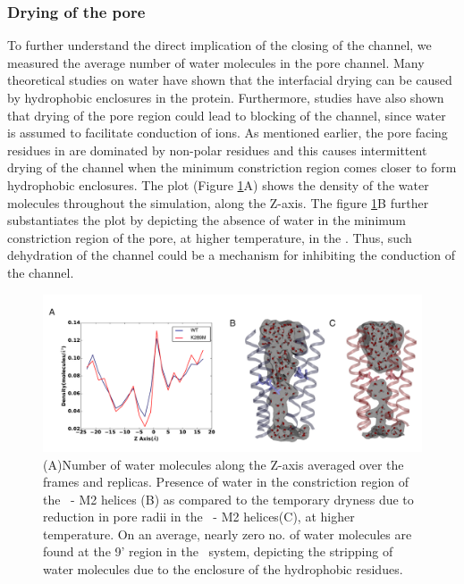 \documentclass[12pt,onecolumn]{biophys}
\begin{document}
\subsubsection*{Drying of the pore}
To further understand the direct implication of the closing of the \MT channel, we measured the average number of water molecules in the pore channel. Many theoretical studies on water have shown that the interfacial drying can be caused by hydrophobic enclosures in the protein\cite{Zhu2010}. Furthermore, studies\cite{Zhu2012,Dong2013} have also shown that drying of the pore region could lead to blocking of the channel, since water is assumed to facilitate conduction of ions. As mentioned earlier, the pore facing residues in \GABAA are dominated by non-polar residues and this causes intermittent drying of the channel when the minimum constriction region comes closer to form hydrophobic enclosures. The plot (Figure \ref{fig:pore_water}A) shows the density of the water molecules throughout the simulation, along the Z-axis. The figure \ref{fig:pore_water}B further substantiates the plot by depicting the absence of water in the minimum constriction region of the pore, at higher temperature, in the \MTs . Thus, such dehydration of the channel could be a mechanism for inhibiting the conduction of the channel.

\begin{figure}
\begin{center}
\includegraphics[width = 1\textwidth]{figures/water_pore.pdf}
\end{center}
\caption{(A)Number of water molecules along the Z-axis averaged over the frames and replicas. Presence of water in the constriction region of the \WT\ - M2 helices (B) as compared to the temporary dryness due to reduction in pore radii in the  \MT\ - M2 helices(C), at higher temperature. On an average, nearly zero no. of water molecules are found at the 9' region in the \MT\ system, depicting the stripping of water molecules due to the enclosure of the hydrophobic residues.}
\label{fig:pore_water}
\end{figure}
\end{document}
